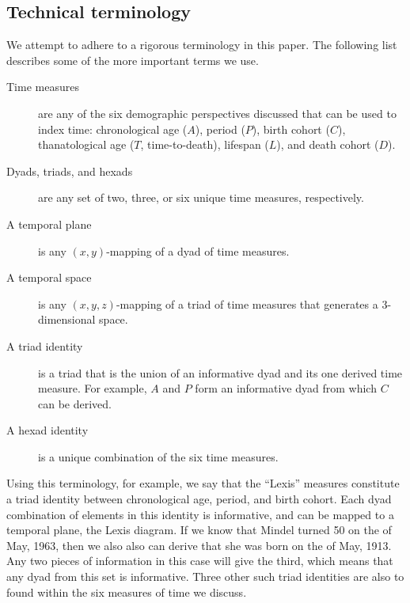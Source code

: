 \documentclass[11pt,oneside,a4paper]{article} %
\begin{document}
\subsection{Technical terminology}
We attempt to adhere to a rigorous terminology in this paper. The following list
describes some of the more important terms we use.
\begin{description}
\item[Time measures] are any of the six demographic perspectives discussed that
can be used to index time: chronological age ($A$), period ($P$), birth cohort ($C$), thanatological
age ($T$, time-to-death), lifespan ($L$), and death cohort ($D$).
\item[Dyads, triads, and hexads] are any set of two, three, or six unique time
measures, respectively.
\item[A temporal plane] is any $(x,y)$-mapping of a dyad of time measures.
\item[A temporal space] is any $(x,y,z)$-mapping of a triad of time
measures that generates a 3-dimensional space.
\item[A triad identity] is a triad that is the union of an informative dyad and
its one derived time measure. For example, $A$ and $P$ form an informative dyad
from which $C$ can be derived.
\item[A hexad identity] is a unique combination of the six time measures.
\end{description}
Using this terminology, for example, we say that the ``Lexis'' measures
constitute a triad identity between chronological age, period, and birth cohort. Each dyad
combination of elements in this identity is informative, and can be mapped to a
temporal plane, the Lexis diagram. If we know that Mindel turned 50 on the
 of May, 1963, then we also also can derive that she was born on the  of
May, 1913. Any two pieces of information in this case will give the third, which
means that any dyad from this set is informative. Three other such triad
identities are also to found within the six measures of time we discuss.
\FloatBarrier
\end{document}
